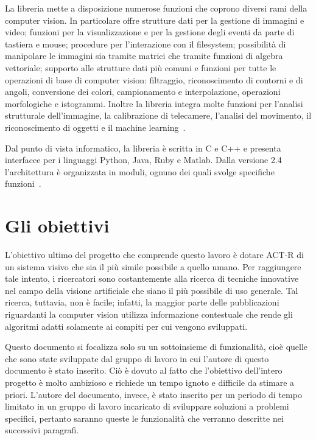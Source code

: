 				La libreria mette a disposizione numerose funzioni che coprono diversi rami della computer vision.
				In particolare offre strutture dati per la gestione di immagini e video; funzioni per la visualizzazione e per la gestione degli eventi da parte di tastiera e mouse; procedure per l'interazione con il filesystem; possibilità di manipolare le immagini sia tramite matrici che tramite funzioni di algebra vettoriale; supporto alle strutture dati più comuni e funzioni per tutte le operazioni di base di computer vision: filtraggio, riconoscimento di contorni e di angoli, conversione dei colori, campionamento e interpolazione, operazioni morfologiche e istogrammi.
				Inoltre la libreria integra molte funzioni per l'analisi strutturale dell'immagine, la calibrazione di telecamere, l'analisi del movimento, il riconoscimento di oggetti e il machine learning~\cite{Agam2006}.
				
				Dal punto di vista informatico, la libreria è scritta in C e C++ e presenta interfacce per i linguaggi Python, Java, Ruby e Matlab.
				Dalla versione 2.4 l'architettura è organizzata in moduli, ognuno dei quali svolge specifiche funzioni~\cite{OpenCVDoc}. 
				


	\section*{Gli obiettivi}\label{obiettivi}
		L'obiettivo ultimo del progetto che comprende questo lavoro è dotare \mbox{ACT-R} di un sistema visivo che sia il più simile possibile a quello umano.
		Per raggiungere tale intento, i ricercatori sono costantemente alla ricerca di tecniche innovative nel campo della visione artificiale che siano il più possibile di uso generale.
		Tal ricerca, tuttavia, non è facile; infatti, la maggior parte delle pubblicazioni riguardanti la computer vision utilizza informazione contestuale che rende gli algoritmi adatti solamente ai compiti per cui vengono sviluppati.
		
		Questo documento si focalizza solo su un sottoinsieme di funzionalità, cioè quelle che sono state sviluppate dal gruppo di lavoro in cui l'autore di questo documento è stato inserito.	
		Ciò è dovuto al fatto che l'obiettivo dell'intero progetto è molto ambizioso e richiede un tempo ignoto e difficile da stimare a priori. 
		L'autore del documento, invece, è stato inserito per un periodo di tempo limitato in un gruppo di lavoro incaricato di sviluppare soluzioni a problemi specifici, pertanto saranno queste le funzionalità che verranno descritte nei successivi paragrafi.

